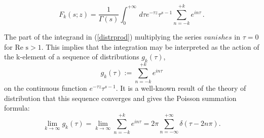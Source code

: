 \documentclass [11pt]{article}
\begin{document}
\begin{equation}
\label{distrprod}
F_k(s;z)=\frac{1}{\Gamma (s)}\int ^{+\infty }_{0}\,d\tau
e^{-\tau z}{\tau}^{s-1}\sum _{n=-k }^{+k }e^{in\tau}\,.
\end{equation}

The part of the integrand in (\ref{distrprod}) multiplying the series 
 $vanishes$ in $\tau=0$ for  $\mbox{Re s} > 1$. This implies that 
the integration may be interpreted as the action of the k-element of a sequence of distributions
$g_k(\tau)$,
\begin{equation}
g_k(\tau):=\sum _{n=-k }^{+k }e^{in\tau}
\end{equation}
on the continuous function $e^{-\tau z}{\tau}^{s-1}$.
It is a well-known result
 of the theory of distribution that this sequence converges and gives the Poisson summation formula:
\begin{equation}\nonumber
\lim_{k\rightarrow\infty}g_k(\tau) = \lim_{k\rightarrow\infty}\sum _{n=-k }^{+k }e^{in\tau} = 2\pi \sum _{n=-\infty }^{+\infty }\delta
(\tau-2n\pi ).
\end{equation}
\end{document}
